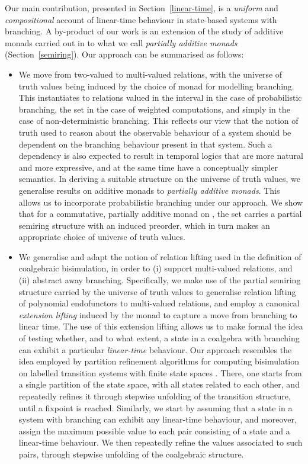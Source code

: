 \documentclass[submission,copyright,creativecommons]{eptcs}
\theoremstyle{plain}\newtheorem{theorem}{Theorem}[section]
\theoremstyle{remark}
\begin{document}
Our main contribution, presented in Section~\ref{linear-time}, is a \emph{uniform} and \emph{compositional} account of linear-time behaviour in state-based systems with branching. A by-product of our work is an extension of the study of additive monads carried out in \cite{Kock2011,CoumansJ2011} to what we call \emph{partially additive monads} (Section~\ref{semiring}). Our approach can be summarised as follows:
\begin{itemize}
\item We move from two-valued to multi-valued relations, with the universe of truth values being induced by the choice of monad for modelling branching. This instantiates to relations valued in the interval  in the case of probabilistic branching, the set  in the case of weighted computations, and simply  in the case of non-deterministic branching. This reflects our view that the notion of truth used to reason about the observable behaviour of a system should be dependent on the branching behaviour present in that system. Such a dependency is also expected to result in temporal logics that are more natural and more expressive, and at the same time have a conceptually simpler semantics. In deriving a suitable structure on the universe of truth values, we generalise results on additive monads \cite{Kock2011,CoumansJ2011} to \emph{partially additive monads}. This allows us to incorporate probabilistic branching under our approach. We show that for a commutative, partially additive monad  on , the set  carries a partial semiring structure with an induced preorder, which in turn makes  an appropriate choice of universe of truth values.
\item We generalise and adapt the notion of relation lifting used in the definition of coalgebraic bisimulation, in order to (i) support multi-valued relations, and (ii) abstract away branching. Specifically, we make use of the partial semiring structure carried by the universe of truth values to generalise relation lifting of polynomial endofunctors to multi-valued relations, and employ a canonical \emph{extension lifting} induced by the monad  to capture a move from branching to linear time. The use of this extension lifting allows us to make formal the idea of testing whether, and to what extent, a state in a coalgebra with branching can exhibit a particular \emph{linear-time} behaviour. Our approach resembles the idea employed by partition refinement algorithms for computing bisimulation on labelled transition systems with finite state spaces \cite{KS90}. There, one starts from a single partition of the state space, with all states related to each other, and repeatedly refines it through stepwise unfolding of the transition structure, until a fixpoint is reached. Similarly, we start by assuming that a state in a system with branching can exhibit any linear-time behaviour, and moreover, assign the maximum possible value to each pair consisting of a state and a linear-time behaviour. We then repeatedly refine the values associated to such pairs, through stepwise unfolding of the coalgebraic structure.
\end{itemize}
\end{document}
